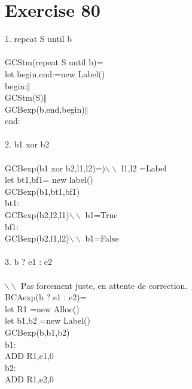 \documentclass[10pt,a4paper]{article}
\begin{document}
\section{Exercise 80}
1. repeat S until b\\
\\
GCStm(repeat S until b)=\\
let begin,end:=new Label()\\
begin:$\Vert$\\
GCStm(S)$\Vert$\\
GCBexp(b,end,begin)$\Vert$\\
end:\\
\\
2. b1 xor b2\\
\\
GCBexp(b1 xor b2,l1,l2)=)$\backslash\backslash$ l1,l2 =Label\\
let bt1,bf1= new label()\\
GCBexp(b1,bt1,bf1)\\
bt1:\\
GCBexp(b2,l2,l1)$\backslash\backslash$ b1=True\\
bf1:\\
GCBexp(b2,l1,l2)$\backslash\backslash$ b1=False\\
\\
3. b ? e1 : e2\\
\\
$\backslash\backslash$ Pas forcement juste, en attente de correction.\\
BCAexp(b ? e1 : e2)=\\
let R1 =new Alloc()\\
let b1,b2 =new Label()\\
GCBexp(b,b1,b2)\\
b1:\\
ADD R1,e1,0\\
b2:\\
ADD R1,e2,0\\
\end{document}
